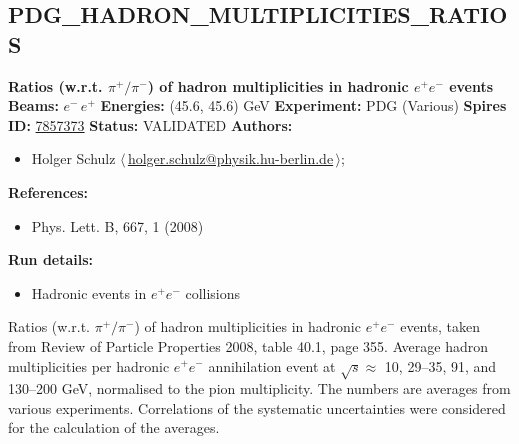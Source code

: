 \subsection[PDG\_HADRON\_MULTIPLICITIES\_RATIOS]{PDG\_HADRON\_MULTIPLICITIES\_RATIOS\,\cite{Amsler:2008zzb}}
\textbf{Ratios (w.r.t. $\pi^+/\pi^-$) of hadron multiplicities in hadronic $e^+e^-$ events}\newline
\textbf{Beams:} $e^-$\,$e^+$ \newline
\textbf{Energies:} (45.6, 45.6) GeV \newline
\textbf{Experiment:} PDG (Various) \newline
\textbf{Spires ID:} \href{http://www.slac.stanford.edu/spires/find/hep/www?rawcmd=key+7857373}{7857373}\newline
\textbf{Status:} VALIDATED\newline
\textbf{Authors:}
\begin{itemize}
  \item Holger Schulz $\langle\,$\href{mailto:holger.schulz@physik.hu-berlin.de}{holger.schulz@physik.hu-berlin.de}$\,\rangle$;
\end{itemize}
\textbf{References:}
\begin{itemize}
  \item Phys. Lett. B, 667, 1 (2008)
\end{itemize}
\textbf{Run details:}
\begin{itemize}

  \item Hadronic events in $e^+ e^-$ collisions\end{itemize}

\noindent Ratios (w.r.t. $\pi^+/\pi^-$) of hadron multiplicities in hadronic $e^+ e^-$ events, taken from Review of Particle Properties 2008, table 40.1, page 355.  Average hadron multiplicities per hadronic $e^+ e^-$ annihilation event at $\sqrt{s} \approx$ 10, 29--35, 91, and 130--200 GeV, normalised to the pion multiplicity. The numbers are averages from various experiments. Correlations of the systematic uncertainties were considered for the calculation of the averages.

\clearpage


\clearpage

